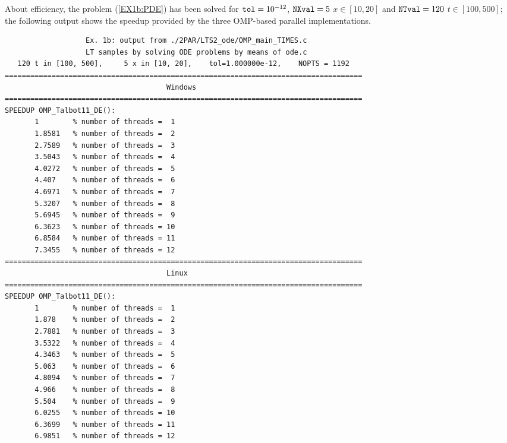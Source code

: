 \documentclass[a4paper,10pt]{report}%
\begin{document}
About efficiency, the problem (\ref{EX1b:PDE}) has been solved for ${\tt tol}=10^{-12}$, ${\tt NXval}=5$ $x\in[10,20]$
and ${\tt NTval}=120$ $t\in[100,500]$; the following output shows the speedup provided by the three OMP-based
parallel implementations.
\begin{lstlisting}
                   Ex. 1b: output from ./2PAR/LTS2_ode/OMP_main_TIMES.c
                   LT samples by solving ODE problems by means of ode.c
   120 t in [100, 500],     5 x in [10, 20],    tol=1.000000e-12,    NOPTS = 1192
====================================================================================
                                      Windows
====================================================================================
SPEEDUP OMP_Talbot11_DE():
       1        % number of threads =  1
       1.8581   % number of threads =  2
       2.7589   % number of threads =  3
       3.5043   % number of threads =  4
       4.0272   % number of threads =  5
       4.407    % number of threads =  6
       4.6971   % number of threads =  7
       5.3207   % number of threads =  8
       5.6945   % number of threads =  9
       6.3623   % number of threads = 10
       6.8584   % number of threads = 11
       7.3455   % number of threads = 12
====================================================================================
                                      Linux
====================================================================================
SPEEDUP OMP_Talbot11_DE():
       1        % number of threads =  1
       1.878    % number of threads =  2
       2.7881   % number of threads =  3
       3.5322   % number of threads =  4
       4.3463   % number of threads =  5
       5.063    % number of threads =  6
       4.8094   % number of threads =  7
       4.966    % number of threads =  8
       5.504    % number of threads =  9
       6.0255   % number of threads = 10
       6.3699   % number of threads = 11
       6.9851   % number of threads = 12


\end{lstlisting}
\end{document}
